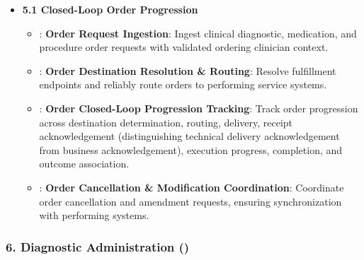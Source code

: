 \begin{itemize}

\item 
\textbf{5.1 Closed-Loop Order Progression}


\begin{itemize}

\item 
\texttt{}: \textbf{Order Request Ingestion}: Ingest clinical diagnostic, medication, and procedure order requests with validated ordering clinician context.



\item 
\texttt{}: \textbf{Order Destination Resolution \& Routing}: Resolve fulfillment endpoints and reliably route orders to performing service systems.



\item 
\texttt{}: \textbf{Order Closed-Loop Progression Tracking}: Track order progression across destination determination, routing, delivery, receipt acknowledgement (distinguishing technical delivery acknowledgement from business acknowledgement), execution progress, completion, and outcome association.



\item 
\texttt{}: \textbf{Order Cancellation \& Modification Coordination}: Coordinate order cancellation and amendment requests, ensuring synchronization with performing systems.



\end{itemize}


\end{itemize}
\label{rad:enabling:308}
\subsubsection*{6. Diagnostic Administration (\texttt{})}
\label{rad:enabling:309}

